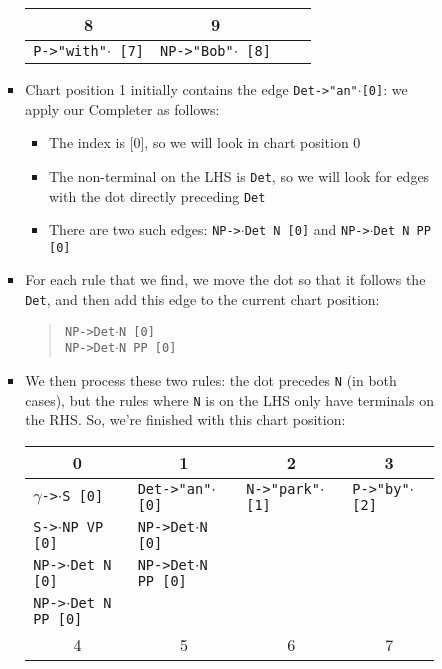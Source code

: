 \documentclass[a4paper]{article}
\begin{document}
\begin{enumerate}
\begin{enumerate}
\begin{enumerate}
\begin{itemize}
\begin{table}[hp]
\begin{tabular}{l|l|l|l}
\hline
\multicolumn{1}{c}{8} & \multicolumn{1}{c}{9} & \multicolumn{1}{c}{} & \\
\hline
\texttt{P->"with"}$\cdot$\texttt{ [7]} & \texttt{NP->"Bob"}$\cdot$\texttt{ [8]} & & \\
\hline
\end{tabular}
\end{table}
\item Chart position 1 initially contains the edge \texttt{Det->"an"}$\cdot$\texttt{[0]}: we apply our Completer as follows:
\begin{itemize}
\item The index is [0], so we will look in chart position 0
\item The non-terminal on the LHS is \texttt{Det}, so we will look for edges with the dot directly preceding \texttt{Det}
\item There are two such edges: \texttt{NP->}$\cdot$\texttt{Det N [0]} and \texttt{NP->}$\cdot$\texttt{Det N PP [0]}
\end{itemize}
\item For each rule that we find, we move the dot so that it follows the \texttt{Det}, and then add this edge to the current chart position:
\begin{quote}
\texttt{NP->Det}$\cdot$\texttt{N [0]}\\
\texttt{NP->Det}$\cdot$\texttt{N PP [0]}
\end{quote}
\item We then process these two rules: the dot precedes \texttt{N} (in both cases), but the rules where \texttt{N} is on the LHS only have terminals on the RHS. So, we're finished with this chart position:
\begin{table}[hp]
\centering
\begin{tabular}{l|l|l|l}
\multicolumn{1}{c}{0} & \multicolumn{1}{c}{1} &\multicolumn{1}{c}{2} & \multicolumn{1}{c}{3} \\
\hline
$\gamma$\texttt{->}$\cdot$\texttt{S [0]} & \texttt{Det->"an"}$\cdot$\texttt{ [0]} & \texttt{N->"park"}$\cdot$\texttt{ [1]} & \texttt{P->"by"}$\cdot$\texttt{ [2]} \\
\texttt{S->}$\cdot$\texttt{NP VP [0]} & \texttt{NP->Det}$\cdot$\texttt{N [0]} & & \\
\texttt{NP->}$\cdot$\texttt{Det N [0]} & \texttt{NP->Det}$\cdot$\texttt{N PP [0]} & & \\
\texttt{NP->}$\cdot$\texttt{Det N PP [0]} & & & \\
\hline
\multicolumn{1}{c}{4} & \multicolumn{1}{c}{5} & \multicolumn{1}{c}{6} & \multicolumn{1}{c}{7} \\

\end{tabular}
\end{table}
\end{itemize}
\end{enumerate}
\end{enumerate}
\end{enumerate}
\end{document}
